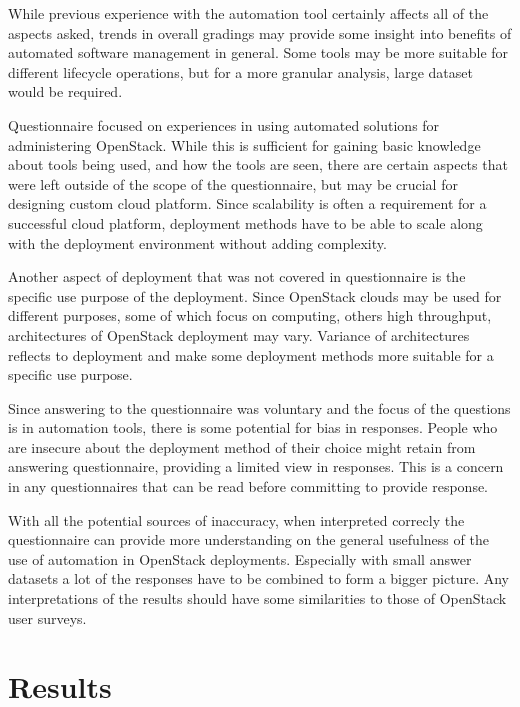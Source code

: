 \documentclass[officiallayout]{tktla}
\begin{document}
While previous experience with the automation tool certainly affects all of the
aspects asked, trends in overall gradings may provide some insight into
benefits of automated software management in general. Some tools may be more
suitable for different lifecycle operations, but for a more granular analysis,
large dataset would be required.

Questionnaire focused on experiences in using automated solutions for
administering OpenStack. While this is sufficient for gaining basic knowledge
about tools being used, and how the tools are seen, there are certain aspects
that were left outside of the scope of the questionnaire, but may be crucial
for designing custom cloud platform. Since scalability is often a requirement
for a successful cloud platform, deployment methods have to be able to scale
along with the deployment environment without adding complexity.

Another aspect of deployment that was not covered in questionnaire is the
specific use purpose of the deployment. Since OpenStack clouds may be used for
different purposes, some of which focus on computing, others high throughput,
architectures of OpenStack deployment may vary. Variance of architectures
reflects to deployment and make some deployment methods more suitable for a
specific use purpose.

Since answering to the questionnaire was voluntary and the focus of the
questions is in automation tools, there is some potential for bias in
responses. People who are insecure about the deployment method of their choice
might retain from answering questionnaire, providing a limited view in
responses. This is a concern in any questionnaires that can be read before
committing to provide response.

With all the potential sources of inaccuracy, when interpreted correcly the
questionnaire can provide more understanding on the general usefulness of the
use of automation in OpenStack deployments. Especially with small answer
datasets a lot of the responses have to be combined to form a bigger picture.
Any interpretations of the results should have some similarities to those of
OpenStack user surveys.

\section{Results}
\end{document}
